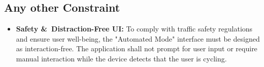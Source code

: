 \subsection{Any other Constraint}
\begin{itemize}
    \item \textbf{Safety \&\ Distraction-Free UI:} To comply with traffic safety regulations and ensure user well-being, the "Automated Mode" interface must be designed as interaction-free. The application shall not prompt for user input or require manual interaction while the device detects that the user is cycling.
\end{itemize}